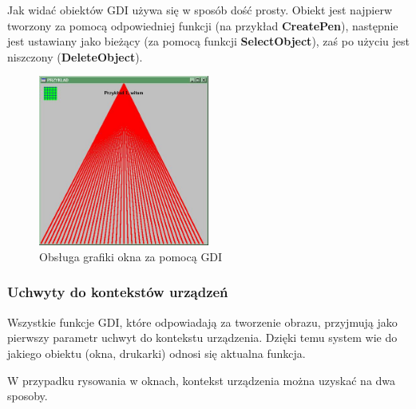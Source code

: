 Jak widać obiektów GDI używa się w sposób dość prosty. Obiekt jest najpierw tworzony
za pomocą odpowiedniej funkcji (na przykład {\bf CreatePen}), następnie jest ustawiany jako
bieżący (za pomocą funkcji {\bf SelectObject}), zaś po użyciu jest niszczony ({\bf DeleteObject}).

\begin{figure}
\begin{center}
\includegraphics[width=0.5\textwidth]{./pic/p03}
\caption{Obsługa grafiki okna za pomocą GDI}
\end{center}
\end{figure}

\subsubsection{Uchwyty do kontekstów urządzeń}

Wszystkie funkcje GDI, które odpowiadają za tworzenie obrazu, przyjmują jako pierwszy 
parametr uchwyt do kontekstu urządzenia. Dzięki temu system wie do jakiego obiektu (okna, drukarki)
odnosi się aktualna funkcja. 

W przypadku rysowania w oknach, kontekst urządzenia można uzyskać na dwa sposoby.

